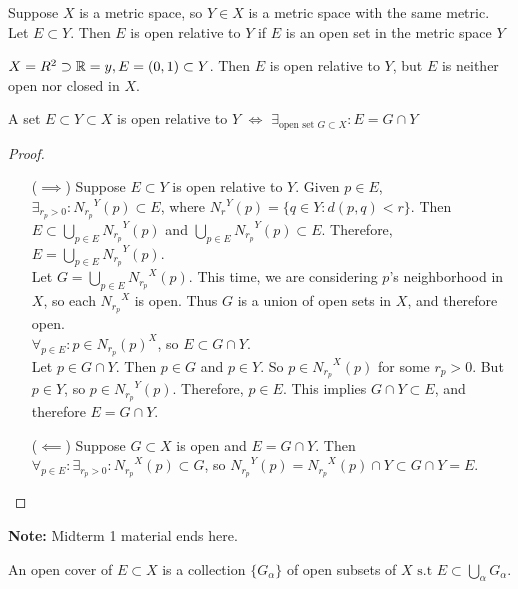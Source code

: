 \begin{definition}
	Suppose $X$ is a metric space, so $Y \in X$ is a metric space with the same metric. Let $E \subset Y$. Then $E$ is open relative to $Y$ if $E$ is an open set in the metric space $Y$
\end{definition}

\begin{example}
	$X=R^2 \supset \mathbb{R} =y, E=(0,1) \subset Y$. Then $E$ is open relative to $Y$, but $E$ is neither open nor closed in $X$.
\end{example}

\begin{thm}[30]
	A set $E \subset Y \subset X$ is open relative to $Y$ $\Leftrightarrow $ $\exists_{\text{open set }G \subset  X}: E=G \cap Y$
	\begin{proof}
		\begin{itemize}
			\item[($\implies$)] Suppose $E \subset Y$ is open relative to $Y$. Given $p \in E$, $\exists_{r_p>0}: {N_{r_p}}^{Y}(p) \subset E$, where ${N_r}^{Y}(p)=\{q \in Y: d(p,q)<r\}$.
			      Then $E \subset \bigcup_{p \in E} {N_{r_p}}^{Y}(p)$ and $\bigcup_{p \in E} {N_{r_p}}^{Y}(p) \subset E$.
			      Therefore, $E= \bigcup_{p \in E} {N_{r_p}}^{Y}(p)$.\\
			      Let $G= \bigcup_{p \in E}{N_{r_p}}^{X}(p)$.
			      This time, we are considering $p$'s neighborhood in $X$, so each ${N_{r_p}}^{X}$ is open.
			      Thus $G$ is a union of open sets in $X$, and therefore open.\\
			      $\forall_{p \in E}: p \in {N_{r_p}(p)}^{X}$, so $E \subset G \cap Y$.\\
			      Let $p \in G \cap Y$. Then $p \in G$ and $p \in Y$. So $p \in {N_{r_p}}^{X}(p)$ for some $r_p>0$. But $p \in Y$, so $p \in {N_{r_p}}^{Y}(p)$. Therefore, $p \in E$. This implies $G \cap Y \subset E$, and therefore $E=G \cap Y$.
			\item [($\impliedby$)]
			      Suppose $G \subset X$ is open and $E= G \cap Y$.
			      Then $\forall_{p \in E}: \exists_{r_p>0}: {N_{r_p}}^{X}(p) \subset G $, so ${N_{r_p}}^{Y}(p)={N_{r_p}}^{X}(p) \cap Y \subset G \cap Y=E$.
		\end{itemize}
	\end{proof}
\end{thm}

\textbf{Note:} Midterm 1 material ends here.


\begin{definition}
	An open cover of $E \subset X$ is a collection $\{G_{\alpha}\}$ of open subsets of $X \text{ s.t } E \subset \bigcup_{\alpha} G_{\alpha}$.
\end{definition}

